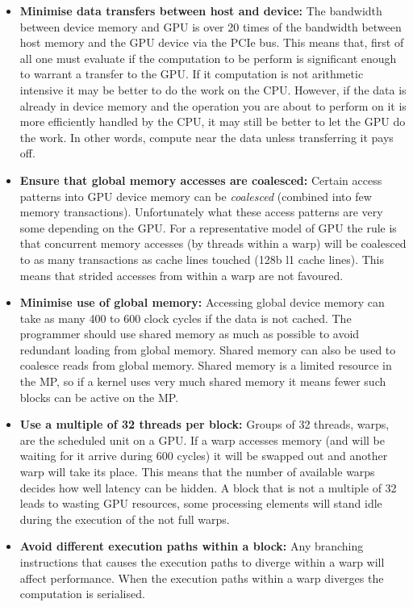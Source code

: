 \documentclass[a4paper]{book}
\begin{document}
\begin{itemize} 

\item {\bf Minimise data transfers between host and device:} The bandwidth between device memory 
and GPU is over 20 times of the bandwidth between host memory and the GPU device via the PCIe bus.
This means that, first of all one must evaluate if the computation to be perform is significant 
enough to warrant a transfer to the GPU. If it computation is not arithmetic intensive it may be 
better to do the work on the CPU. However, if the data is already in device memory and 
the operation you are about to perform on it is more efficiently handled by the CPU, it may still 
be better to let the GPU do the work. In other words, compute near the data unless transferring it 
pays off. 

\item {\bf Ensure that global memory accesses are coalesced:} Certain access patterns into 
GPU device memory can be {\em coalesced} (combined into few memory transactions). Unfortunately 
what these access patterns are very some depending on the GPU. For a representative model of 
GPU the rule is that concurrent memory accesses (by threads within a warp) will be coalesced 
to as many transactions as cache lines touched (128b l1 cache lines). This means that strided 
accesses from within a warp are not favoured. 

\item {\bf Minimise use of global memory:} Accessing global device memory can take as 
many 400 to 600 clock cycles if the data is not cached. The programmer should 
use shared memory as much as possible to avoid redundant loading from global memory.
Shared memory can also be used to coalesce reads from global memory. Shared memory is 
a limited resource in the MP, so if a kernel uses very much shared memory it means 
fewer such blocks can be active on the MP. 

\item {\bf Use a multiple of 32 threads per block:} Groups of 32 threads, warps, are the 
scheduled unit on a GPU. If a warp accesses memory (and will be waiting for it arrive during 
600 cycles) it will be swapped out and another warp will take its place. This means that 
the number of available warps decides how well latency can be hidden. A block that is not a 
multiple of 32 leads to wasting GPU resources, some processing elements will stand idle during 
the execution of the not full warps. 

\item {\bf Avoid different execution paths within a block:} Any branching instructions that 
causes the execution paths to diverge within a warp will affect performance. When the execution 
paths within a warp diverges the computation is serialised. 


\end{itemize}
\end{document}
